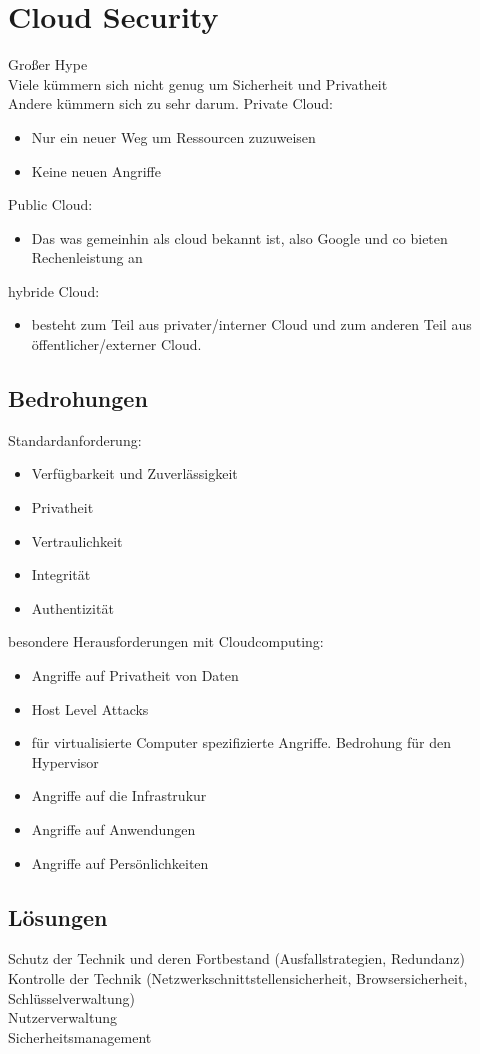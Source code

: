 \documentclass{article} %
\begin{document}
\section{Cloud Security}
Großer Hype\\
Viele kümmern sich nicht genug um Sicherheit und Privatheit\\
Andere kümmern sich zu sehr darum.
Private Cloud:
\begin{itemize}
	\item Nur ein neuer Weg um Ressourcen zuzuweisen
    \item Keine neuen Angriffe
\end{itemize}
Public Cloud:
\begin{itemize}
	\item Das was gemeinhin als cloud bekannt ist, also Google und co bieten Rechenleistung an
\end{itemize}
hybride Cloud:
\begin{itemize}
	\item besteht zum Teil aus privater/interner Cloud und zum anderen Teil aus öffentlicher/externer Cloud.
\end{itemize}
\subsection{Bedrohungen}
Standardanforderung:
\begin{itemize}
	\item Verfügbarkeit und Zuverlässigkeit
    \item Privatheit
    \item Vertraulichkeit
    \item Integrität
    \item Authentizität
\end{itemize}
besondere Herausforderungen mit Cloudcomputing:
\begin{itemize}
	\item Angriffe auf Privatheit von Daten
    \item Host Level Attacks
    \item für virtualisierte Computer spezifizierte Angriffe. Bedrohung für den Hypervisor
    \item Angriffe auf die Infrastrukur
    \item Angriffe auf Anwendungen
    \item Angriffe auf Persönlichkeiten
\end{itemize}
\subsection{Lösungen}
Schutz der Technik und deren Fortbestand (Ausfallstrategien, Redundanz)\\
Kontrolle der Technik (Netzwerkschnittstellensicherheit, Browsersicherheit, Schlüsselverwaltung)\\
Nutzerverwaltung\\
Sicherheitsmanagement
\end{document}
